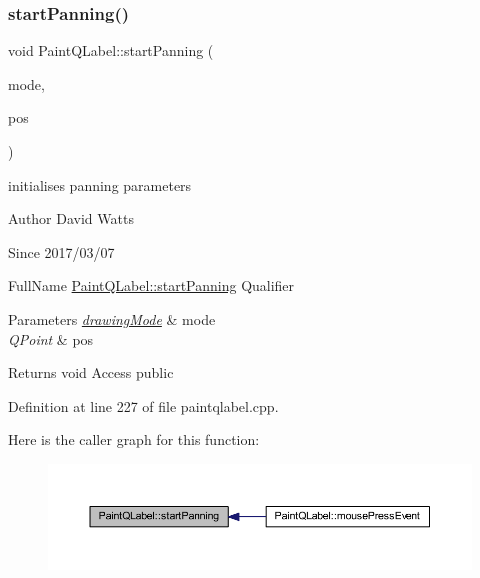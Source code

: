 \subsubsection{\texorpdfstring{start\+Panning()}{startPanning()}}
{\footnotesize\ttfamily void Paint\+Q\+Label\+::start\+Panning (\begin{DoxyParamCaption}\item[{drawing\+Mode\+::drawing\+Mode}]{mode,  }\item[{Q\+Point}]{pos }\end{DoxyParamCaption})}

initialises panning parameters

\begin{DoxyAuthor}{Author}
David Watts 
\end{DoxyAuthor}
\begin{DoxySince}{Since}
2017/03/07
\end{DoxySince}
Full\+Name \hyperlink{class_paint_q_label_a76f7bb92d5971c324ff0998babd5a70f}{Paint\+Q\+Label\+::start\+Panning} Qualifier 
\begin{DoxyParams}{Parameters}
{\em \hyperlink{namespacedrawing_mode}{drawing\+Mode}} & mode \\
\hline
{\em Q\+Point} & pos \\
\hline
\end{DoxyParams}
\begin{DoxyReturn}{Returns}
void Access public 
\end{DoxyReturn}


Definition at line 227 of file paintqlabel.\+cpp.

Here is the caller graph for this function\+:
\nopagebreak
\begin{figure}[H]
\begin{center}
\leavevmode
\includegraphics[width=350pt]{class_paint_q_label_a76f7bb92d5971c324ff0998babd5a70f_icgraph}
\end{center}
\end{figure}
\mbox{\label{class_paint_q_label_adcf7154233dfb4462c1cdd4531ab74ba}} 
